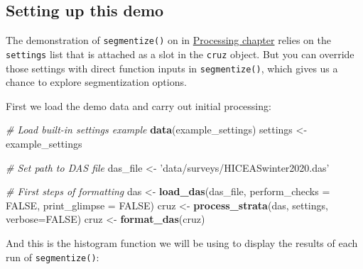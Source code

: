 \documentclass[
]{book}
\newenvironment{Shaded}{\begin{snugshade}}{\end{snugshade}}
\newcommand{\CommentTok}[1]{\textcolor[rgb]{0.56,0.35,0.01}{\textit{#1}}}
\newcommand{\DataTypeTok}[1]{\textcolor[rgb]{0.13,0.29,0.53}{#1}}
\newcommand{\KeywordTok}[1]{\textcolor[rgb]{0.13,0.29,0.53}{\textbf{#1}}}
\newcommand{\NormalTok}[1]{#1}
\newcommand{\OtherTok}[1]{\textcolor[rgb]{0.56,0.35,0.01}{#1}}
\newcommand{\StringTok}[1]{\textcolor[rgb]{0.31,0.60,0.02}{#1}}
\begin{document}
\hypertarget{setting-up-this-demo}{%
\subsection*{Setting up this demo}\label{setting-up-this-demo}}

The demonstration of \texttt{segmentize()} on in \protect\hyperlink{processing}{Processing chapter} relies on the \texttt{settings} list that is attached as a slot in the \texttt{cruz} object. But you can override those settings with direct function inputs in \texttt{segmentize()}, which gives us a chance to explore segmentization options.

First we load the demo data and carry out initial processing:

\begin{Shaded}
\begin{Highlighting}[]
\CommentTok{# Load built-in settings example}
\KeywordTok{data}\NormalTok{(example_settings)}
\NormalTok{settings <-}\StringTok{ }\NormalTok{example_settings}

\CommentTok{# Set path to DAS file}
\NormalTok{das_file <-}\StringTok{ 'data/surveys/HICEASwinter2020.das'}

\CommentTok{# First steps of formatting}
\NormalTok{das <-}\StringTok{ }\KeywordTok{load_das}\NormalTok{(das_file, }
                \DataTypeTok{perform_checks =} \OtherTok{FALSE}\NormalTok{,}
                \DataTypeTok{print_glimpse =} \OtherTok{FALSE}\NormalTok{)}
\NormalTok{cruz <-}\StringTok{ }\KeywordTok{process_strata}\NormalTok{(das,}
\NormalTok{                       settings,}
                       \DataTypeTok{verbose=}\OtherTok{FALSE}\NormalTok{)}
\NormalTok{cruz <-}\StringTok{ }\KeywordTok{format_das}\NormalTok{(cruz)}
\end{Highlighting}
\end{Shaded}

And this is the histogram function we will be using to display the results of each run of \texttt{segmentize()}:
\end{document}
